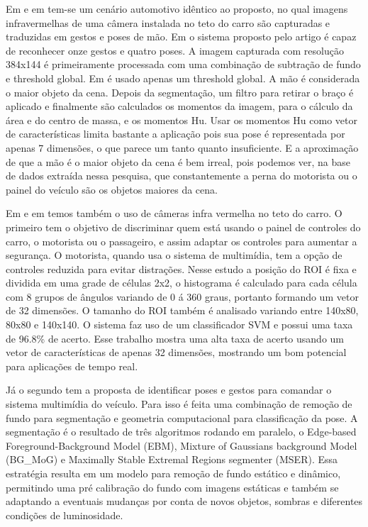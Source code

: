 Em \cite{zobl2004gesture} e em \cite{akyol2000gesture} tem-se um cenário automotivo idêntico ao proposto, no qual imagens infravermelhas de uma câmera instalada no teto do carro são capturadas e traduzidas em gestos e poses de mão. Em \cite{zobl2004gesture} o sistema proposto pelo artigo é capaz de reconhecer onze gestos e quatro poses. A imagem capturada com resolução 384x144 é primeiramente processada com uma combinação de subtração de fundo e threshold global. Em \cite{akyol2000gesture} é usado apenas um threshold global. A mão é considerada o maior objeto da cena. Depois da segmentação, um filtro para retirar o braço é aplicado e finalmente são calculados os momentos da imagem, para o cálculo da área e do centro de massa, e os momentos Hu. Usar os momentos Hu como vetor de características limita bastante a aplicação pois sua pose é representada por apenas 7 dimensões, o que parece um tanto quanto insuficiente. E a aproximação de que a mão é o maior objeto da cena é bem irreal, pois podemos ver, na base de dados extraída nessa pesquisa, que constantemente a perna do motorista ou o painel do veículo são os objetos maiores da cena.

Em \cite{cheng2008real} e em \cite{parada2014hand} temos também o uso de câmeras infra vermelha no teto do carro. O primeiro tem o objetivo de discriminar quem está usando o painel de controles do carro, o motorista ou o passageiro, e assim adaptar os controles para aumentar a segurança. O motorista, quando usa o sistema de multimídia, tem a opção de controles reduzida para evitar distrações. Nesse estudo a posição do ROI é fixa e dividida em uma grade de células 2x2, o histograma é calculado para cada célula com 8 grupos de ângulos variando de 0 á 360 graus, portanto formando um vetor de 32 dimensões. O tamanho do ROI também é analisado variando entre 140x80, 80x80 e 140x140. O sistema faz uso de um classificador SVM e possui uma taxa de 96.8\% de acerto. Esse trabalho mostra uma alta taxa de acerto usando um vetor de características de apenas 32 dimensões, mostrando um bom potencial para aplicações de tempo real.

Já o segundo tem a proposta de identificar poses e gestos para comandar o sistema multimídia do veículo. Para isso é feita uma combinação de remoção de fundo para segmentação e geometria computacional para classificação da pose. A segmentação é o resultado de três algoritmos rodando em paralelo, o Edge-based Foreground-Background Model (EBM), Mixture of Gaussians background Model (BG\_MoG) e Maximally Stable Extremal Regions segmenter (MSER). Essa estratégia resulta em um modelo para remoção de fundo estático e dinâmico, permitindo uma pré calibração do fundo com imagens estáticas e também se adaptando a eventuais mudanças por conta de novos objetos, sombras e diferentes condições de luminosidade.

